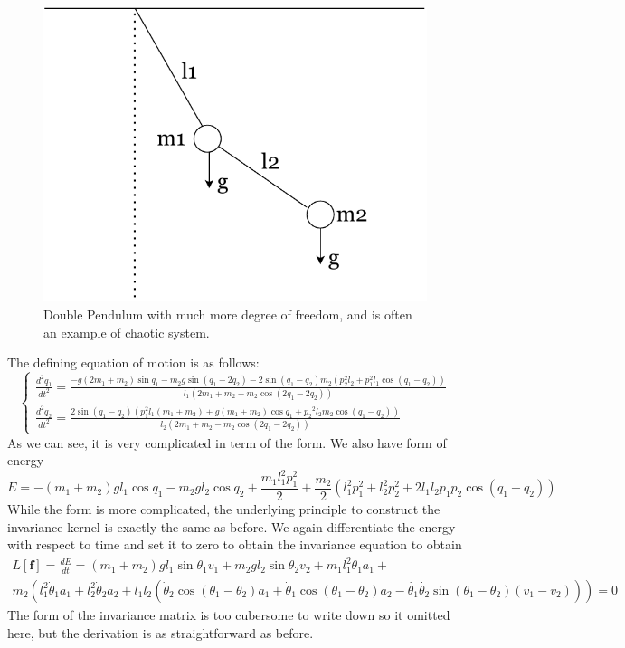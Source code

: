 \documentclass{statsmsc}
\begin{document}
\begin{figure}[H]
        \centering
        \includegraphics[width=0.4\linewidth]{../figures/doublependulum.pdf}
        \caption{Double Pendulum with much more degree of freedom, and is often an example of chaotic system.}
        \label{fig:double_pendulum_diagram}
\end{figure}

The defining equation of motion is as follows:
$$
\begin{cases}
\frac{d^2q_1}{dt^2}=\frac{-g\left(2 m_{1}+m_{2}\right) \sin q_1-m_{2} g \sin \left(q_1-2 q_2\right)-2 \sin \left(q_1-q_2\right) m_{2}\left(p_2^{2} l_{2}+p_1^{2} l_{1} \cos \left(q_1-q_2\right)\right)}{l_{1}\left(2 m_{1}+m_{2}-m_{2} \cos \left(2 q_1-2 q_2\right)\right)} \\
\frac{d^2q_2}{dt^2}=\frac{2 \sin \left(q_1-q_2\right)\left(p_1^{2} l_{1}\left(m_{1}+m_{2}\right)+g\left(m_{1}+m_{2}\right) \cos q_1+p_2{ }^{2} l_{2} m_{2} \cos \left(q_1-q_2\right)\right)}{l_{2}\left(2 m_{1}+m_{2}-m_{2} \cos \left(2 q_1-2 q_2\right)\right)}
\end{cases}
$$
As we can see, it is very complicated in term of the form.
We also have form of energy 
$$
E = -(m_1+m_2)gl_1\cos q_1-m_2gl_2\cos q_2+ \frac{m_1l^2_1p_1^2}{2}+\frac{m_2}{2}(l^2_1p_1^2+l^2_2p_2^2+2l_1l_2p_1p_2\cos(q_1-q_2))
$$
While the form is more complicated, the underlying principle to construct the invariance kernel is exactly the same as before. 
We again differentiate the energy with respect to time and set it to zero to obtain the invariance equation to obtain 
\begin{gather*}
L[\mathbf{f}]=\frac{dE}{dt} = (m_1+m_2)gl_1\sin\theta_1v_1+m_2gl_2\sin\theta_2v_2+m_1l_1^2\dot{\theta}_1a_1+\\m_2(l_1^2\dot{\theta}_1a_1+l_2^2\dot{\theta}_2a_2+l_1l_2(\dot{\theta}_2\cos(\theta_1-\theta_2)a_1+\dot{\theta}_1\cos(\theta_1-\theta_2)a_2-\dot{\theta_1}\dot{\theta_2}\sin(\theta_1-\theta_2)(v_1-v_2)))=0
\end{gather*}
The form of the invariance matrix is too cubersome to write down so it omitted here, but the derivation is as straightforward as before. 
\end{document}
